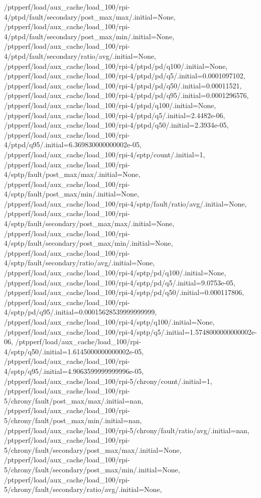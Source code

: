 {    /ptpperf/load/aux_cache/load_100/rpi-4/ptpd/fault/secondary/post_max/max/.initial=None,
    /ptpperf/load/aux_cache/load_100/rpi-4/ptpd/fault/secondary/post_max/min/.initial=None,
    /ptpperf/load/aux_cache/load_100/rpi-4/ptpd/fault/secondary/ratio/avg/.initial=None,
    /ptpperf/load/aux_cache/load_100/rpi-4/ptpd/pd/q100/.initial=None,
    /ptpperf/load/aux_cache/load_100/rpi-4/ptpd/pd/q5/.initial=0.0001097102,
    /ptpperf/load/aux_cache/load_100/rpi-4/ptpd/pd/q50/.initial=0.00011521,
    /ptpperf/load/aux_cache/load_100/rpi-4/ptpd/pd/q95/.initial=0.0001296576,
    /ptpperf/load/aux_cache/load_100/rpi-4/ptpd/q100/.initial=None,
    /ptpperf/load/aux_cache/load_100/rpi-4/ptpd/q5/.initial=2.4482e-06,
    /ptpperf/load/aux_cache/load_100/rpi-4/ptpd/q50/.initial=2.3934e-05,
    /ptpperf/load/aux_cache/load_100/rpi-4/ptpd/q95/.initial=6.369830000000002e-05,
    /ptpperf/load/aux_cache/load_100/rpi-4/sptp/count/.initial=1,
    /ptpperf/load/aux_cache/load_100/rpi-4/sptp/fault/post_max/max/.initial=None,
    /ptpperf/load/aux_cache/load_100/rpi-4/sptp/fault/post_max/min/.initial=None,
    /ptpperf/load/aux_cache/load_100/rpi-4/sptp/fault/ratio/avg/.initial=None,
    /ptpperf/load/aux_cache/load_100/rpi-4/sptp/fault/secondary/post_max/max/.initial=None,
    /ptpperf/load/aux_cache/load_100/rpi-4/sptp/fault/secondary/post_max/min/.initial=None,
    /ptpperf/load/aux_cache/load_100/rpi-4/sptp/fault/secondary/ratio/avg/.initial=None,
    /ptpperf/load/aux_cache/load_100/rpi-4/sptp/pd/q100/.initial=None,
    /ptpperf/load/aux_cache/load_100/rpi-4/sptp/pd/q5/.initial=9.0753e-05,
    /ptpperf/load/aux_cache/load_100/rpi-4/sptp/pd/q50/.initial=0.000117806,
    /ptpperf/load/aux_cache/load_100/rpi-4/sptp/pd/q95/.initial=0.00015628539999999999,
    /ptpperf/load/aux_cache/load_100/rpi-4/sptp/q100/.initial=None,
    /ptpperf/load/aux_cache/load_100/rpi-4/sptp/q5/.initial=1.5748000000000002e-06,
    /ptpperf/load/aux_cache/load_100/rpi-4/sptp/q50/.initial=1.6145000000000002e-05,
    /ptpperf/load/aux_cache/load_100/rpi-4/sptp/q95/.initial=4.9063599999999996e-05,
    /ptpperf/load/aux_cache/load_100/rpi-5/chrony/count/.initial=1,
    /ptpperf/load/aux_cache/load_100/rpi-5/chrony/fault/post_max/max/.initial=nan,
    /ptpperf/load/aux_cache/load_100/rpi-5/chrony/fault/post_max/min/.initial=nan,
    /ptpperf/load/aux_cache/load_100/rpi-5/chrony/fault/ratio/avg/.initial=nan,
    /ptpperf/load/aux_cache/load_100/rpi-5/chrony/fault/secondary/post_max/max/.initial=None,
    /ptpperf/load/aux_cache/load_100/rpi-5/chrony/fault/secondary/post_max/min/.initial=None,
    /ptpperf/load/aux_cache/load_100/rpi-5/chrony/fault/secondary/ratio/avg/.initial=None,
}
